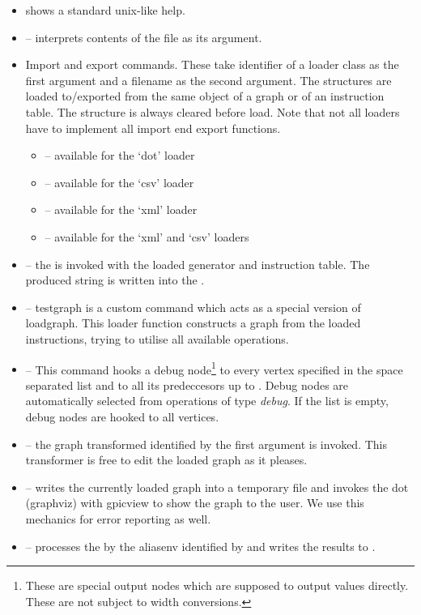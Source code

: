 \begin{itemize}
  \item {} shows a standard unix-like help.
  \item {} -- interprets contents of the file as its argument.
  \item Import and export commands. These take identifier of a loader class as the first argument and a filename as the second argument. The structures are loaded to/exported from the same object of a graph or of an instruction table. The structure is always cleared before load. Note that not all loaders have to implement all import end export functions. 
  \begin{itemize}
    \item {} -- available for the `dot' loader
    \item {} -- available for the `csv' loader
    \item {} -- available for the `xml' loader
    \item {} -- available for the `xml' and `csv' loaders
  \end{itemize}
  \item {} -- the  is invoked with the loaded generator and instruction table. The produced string is written into the .
  \item {} -- testgraph is a custom command which acts as a special version of loadgraph. This loader function constructs a graph from the loaded instructions, trying to utilise all available operations. 
  \item {} -- This command hooks a debug node\footnote{These are special output nodes which are supposed to output values directly. These are not subject to width conversions.} to every vertex specified in the space separated list and to all its predeccesors up to . Debug nodes are automatically selected from operations of type \emph{debug}. If the list is empty, debug nodes are hooked to all vertices.
  \item {} -- the graph transformed identified by the first argument is invoked. This transformer is free to edit the loaded graph as it pleases.
  \item {} -- writes the currently loaded graph into a temporary file and invokes the dot (graphviz) with gpicview to show the graph to the user. We use this mechanics for error reporting as well.
  \item {} -- processes the  by the aliasenv identified by  and writes the results to .
\end{itemize}

